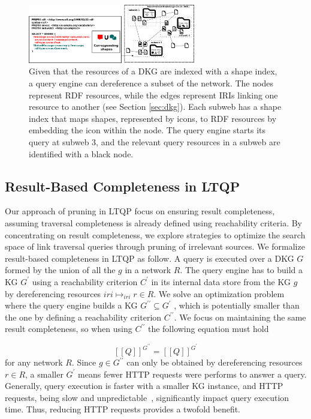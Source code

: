 \begin{figure}
   \centering
   \includegraphics[width=0.65\textwidth]{figure/dkg.png}
   \caption{
      Given that the resources of a DKG are indexed with a shape index, a query engine can dereference a subset of the network.
      The nodes represent RDF resources, while the edges represent IRIs linking one resource to another (see Section \ref{sec:dkg}).
      Each subweb has a shape index that maps shapes, represented by icons, to RDF resources by embedding the icon within the node.
      The query engine starts its query at subweb 3, and the relevant query resources in a subweb are identified with a black node.
    }
    \label{fig:dkg}
\end{figure}


\subsection{Result-Based Completeness in LTQP}\label{sec:slde}

Our approach of pruning in LTQP focus on ensuring result completeness, assuming traversal completeness is already defined using reachability criteria.
By concentrating on result completeness, we explore strategies to optimize the search space of link traversal queries through pruning of irrelevant sources.
We formalize result-based completeness in LTQP as follow.
A query is executed over a DKG $G$ formed by the union of all the $g$ in a network $R$.
The query engine has to build a KG $G^{\prime}$ using a reachability criterion $C^{\prime}$ in its internal data store from the KG $g$ by dereferencing resources $iri \mapsto_{iri} r \in R$.
We solve an optimization problem where the query engine builds a KG
$G^{\prime\prime} \subseteq G^{\prime}$
, which is potentially smaller than the one by defining a reachability criterion $C^{\prime\prime}$.
We focus on maintaining the same result completeness, so when using $C^{\prime\prime}$ the following equation must hold

\begin{equation}\label{eq:evalQueryStructuralAssumption}
   [\![ Q ]\!]^{G^{\prime\prime}} = [\![ Q ]\!]^{G^{\prime}}
\end{equation}
for any network $R$.
Since $g \in G^{\prime\prime}$ can only be obtained by dereferencing resources $r \in R$, a smaller $G^\prime$ means fewer HTTP requests were performs to answer a query.  
Generally, query execution is faster with a smaller KG instance, and HTTP requests, being slow and unpredictable~\cite{hartig2016walking}, significantly impact query execution time.  
Thus, reducing HTTP requests provides a twofold benefit.

